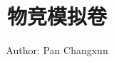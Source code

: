 \documentclass[12pt,a4paper]{article}
\title{\textbf{物竞模拟卷}}
\author{Author: Pan Changxun}
\date{}
\begin{document}
\maketitle
\footnotesize








\end{document}
